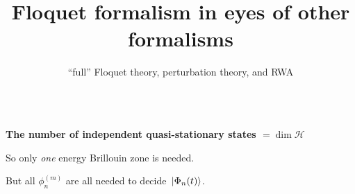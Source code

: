 \documentclass[t]{beamer}
\begin{document}
\begin{frame}
\begin{columns}
\begin{column}{0.39\textwidth}
\begin{minipage}{\columnwidth}
{               
        }
    \end{minipage}
\end{column}

\end{columns}

\vspace{0.5cm}

\textbf{The number of independent quasi-stationary states $= \dim \mathcal{H}$}

So only \emph{one} energy Brillouin zone is needed.

\vspace{0.5cm}

But all $\phi_n^{(m)}$ are all needed to decide $\ket*{\Phi_n(t)}$.

\end{frame}

\endgroup

\begingroup

\title{Floquet formalism in eyes of other formalisms}
\subtitle{``full'' Floquet theory, perturbation theory, and RWA}
\author{}
\date{}

\begin{frame}
    \titlepage
\end{frame}
\end{document}
